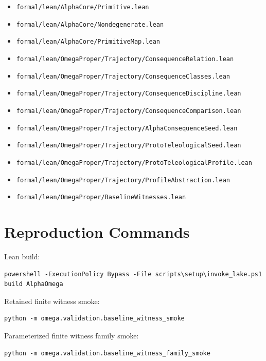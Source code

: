 \documentclass[11pt]{article}
\begin{document}
\begin{itemize}[leftmargin=*]
  \item \texttt{formal/lean/AlphaCore/Primitive.lean}
  \item \texttt{formal/lean/AlphaCore/Nondegenerate.lean}
  \item \texttt{formal/lean/AlphaCore/PrimitiveMap.lean}
  \item \texttt{formal/lean/OmegaProper/Trajectory/ConsequenceRelation.lean}
  \item \texttt{formal/lean/OmegaProper/Trajectory/ConsequenceClasses.lean}
  \item \texttt{formal/lean/OmegaProper/Trajectory/ConsequenceDiscipline.lean}
  \item \texttt{formal/lean/OmegaProper/Trajectory/ConsequenceComparison.lean}
  \item \texttt{formal/lean/OmegaProper/Trajectory/AlphaConsequenceSeed.lean}
  \item \texttt{formal/lean/OmegaProper/Trajectory/ProtoTeleologicalSeed.lean}
  \item \texttt{formal/lean/OmegaProper/Trajectory/ProtoTeleologicalProfile.lean}
  \item \texttt{formal/lean/OmegaProper/Trajectory/ProfileAbstraction.lean}
  \item \texttt{formal/lean/OmegaProper/BaselineWitnesses.lean}
\end{itemize}

\section{Reproduction Commands}

Lean build:

\begin{verbatim}
powershell -ExecutionPolicy Bypass -File scripts\setup\invoke_lake.ps1 build AlphaOmega
\end{verbatim}

Retained finite witness smoke:

\begin{verbatim}
python -m omega.validation.baseline_witness_smoke
\end{verbatim}

Parameterized finite witness family smoke:

\begin{verbatim}
python -m omega.validation.baseline_witness_family_smoke
\end{verbatim}



\end{document}
